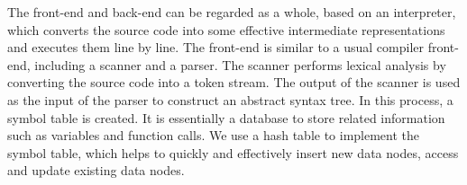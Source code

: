 \documentclass[runningheads]{llncs}
\begin{document}
The front-end and back-end can be regarded as a whole, based on an interpreter, which converts the source code into some effective intermediate representations and executes them line by line. The front-end is similar to a usual compiler front-end, including a scanner and a parser. The scanner performs lexical analysis by converting the  source code  into a token stream.  The output of the scanner is used as the input of the parser to construct an abstract syntax tree.
In this process, a symbol table is created. It is essentially a database to store related information such as variables and function calls. %
We use a hash table to implement the symbol table, which helps to quickly and effectively insert new data nodes, access and update existing data nodes. %
\end{document}
